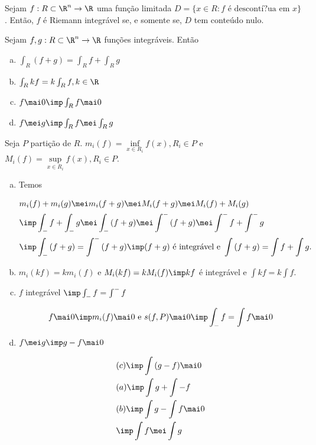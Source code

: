 \documentclass[11pt, oneside, a4paper]{gsm-l}
\begin{document}
\begin{teo}
Sejam $f:R \subset \R^n \to \R$ uma função limitada $D=\{ x \in R: f \text{ é descontí?ua em $x$} \}$. Então, $f$ é Riemann integrável se, e somente se, $D$ tem conte\'udo nulo.
\end{teo}

\begin{prop}
Sejam $f,g:R \subset \R^n \to \R$ funções integráveis. Então

\begin{enumerate}[a)]
 \item $\int_R (f + g) = \int_R f + \int_R g$
 \item $\int_R kf = k \int_R f, k \in \R$
 \item $f \mai 0 \imp \int_R f \mai 0$
 \item $f \mei g \imp \int_R f \mei \int_R g$
\end{enumerate}

\end{prop}

\begin{dem}
Seja $P$ partição de $R$. $m_i (f) = \mathop {\inf}\limits_{x \in R_i} f(x), R_i \in P$ e $M_i (f) = \mathop {\sup}\limits_{x \in R_i} f(x), R_i \in P$.

\begin{enumerate}[a)]
 \item Temos

\[
\begin{gathered}
  m_i (f) + m_i (g) \mei m_i (f + g) \mei M_i (f + g) \mei M_i (f) + M_i (g) \hfill \\
  \imp \int_{-} f  + \int_{-} g \mei \int_{-} {(f + g)} \mei \int^{-}  {(f + g)} \mei \int^{-}  f  + \int^{-}  g  \hfill \\
  \imp \int_{-} {(f + g)}  = \int^{-}  {(f + g)} \imp(f + g) \text{ é integrável e } \int {(f + g)} = \int f + \int g. \hfill \\ 
\end{gathered} 
\]

 \item $m_i (kf) = k m_i (f)$ e $M_i (kf) = k M_i (f) \imp kf$ é integrável e $\int kf = k \int f$.

 \item $f$ integrável $\imp \int_{-} f = \int^{-} f$

\[
f \mai 0 \imp m_i (f) \mai 0 \text{ e } s(f,P) \mai 0 \imp \int_{-} f = \int f \mai 0
\]

 \item $f \mei g \imp g - f \mai 0$

\[
\begin{gathered}
  (c) \imp \int {(g - f) \mai 0}  \hfill \\
  (a) \imp \int g  + \int { - f}  \hfill \\
  (b) \imp \int g  - \int f \mai 0 \hfill \\
  \imp \int f \mei \int g  \hfill \\ 
\end{gathered} 
\]

\end{enumerate}

\end{dem}
\end{document}
